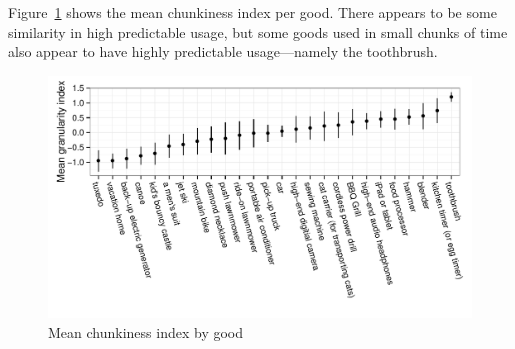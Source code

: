 \documentclass[11pt]{article}
\newcommand{\important}[1]{\textcolor{red}{\textbf{#1}}}
\newcommand{\important}[1]{#1}
\begin{document}
Figure~\ref{fig:granularity} shows the mean chunkiness index per good. 
There appears to be some similarity in high predictable usage, but some goods used in small chunks of time also appear to have highly predictable usage---namely the toothbrush. 

\begin{figure}
\centering 
\caption{Mean chunkiness index by good \label{fig:granularity}}
\begin{minipage}{0.90 \linewidth}
\includegraphics[width = \linewidth]{./plots/granularity.pdf} 
\end{minipage} 
\end{figure} 
\end{document}
